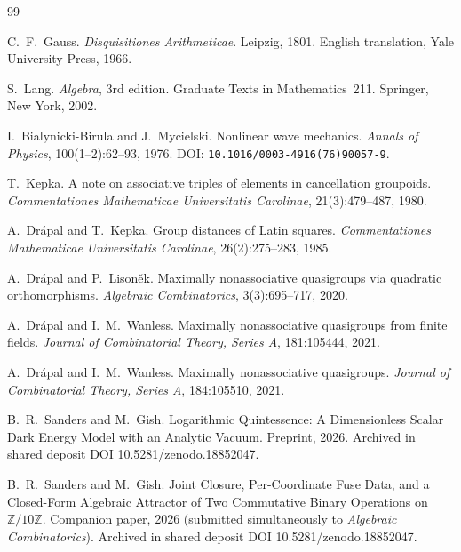 \documentclass[11pt,reqno]{amsart}
\theoremstyle{plain}
\theoremstyle{definition}
\theoremstyle{remark}
\begin{document}
\begin{thebibliography}{99}

C.~F.~Gauss.
\newblock \emph{Disquisitiones Arithmeticae}.
\newblock Leipzig, 1801.
\newblock English translation, Yale University Press, 1966.

S.~Lang.
\newblock \emph{Algebra}, 3rd edition.
\newblock Graduate Texts in Mathematics~211. Springer, New York, 2002.

I.~Bialynicki-Birula and J.~Mycielski.
\newblock Nonlinear wave mechanics.
\newblock \emph{Annals of Physics}, 100(1--2):62--93, 1976.
\newblock DOI: \texttt{10.1016/0003-4916(76)90057-9}.

T.~Kepka.
\newblock A note on associative triples of elements in cancellation groupoids.
\newblock \emph{Commentationes Mathematicae Universitatis Carolinae},
21(3):479--487, 1980.

A.~Dr\'{a}pal and T.~Kepka.
\newblock Group distances of Latin squares.
\newblock \emph{Commentationes Mathematicae Universitatis Carolinae},
26(2):275--283, 1985.

A.~Dr\'{a}pal and P.~Lison\v{e}k.
\newblock Maximally nonassociative quasigroups via quadratic orthomorphisms.
\newblock \emph{Algebraic Combinatorics}, 3(3):695--717, 2020.

A.~Dr\'{a}pal and I.~M.~Wanless.
\newblock Maximally nonassociative quasigroups from finite fields.
\newblock \emph{Journal of Combinatorial Theory, Series A}, 181:105444, 2021.

A.~Dr\'{a}pal and I.~M.~Wanless.
\newblock Maximally nonassociative quasigroups.
\newblock \emph{Journal of Combinatorial Theory, Series A}, 184:105510, 2021.

B.~R.~Sanders and M.~Gish.
\newblock Logarithmic Quintessence: A Dimensionless Scalar Dark Energy
Model with an Analytic Vacuum.
\newblock Preprint, 2026.
\newblock Archived in shared deposit DOI 10.5281/zenodo.18852047.

B.~R.~Sanders and M.~Gish.
\newblock Joint Closure, Per-Coordinate Fuse Data, and a Closed-Form
Algebraic Attractor of Two Commutative Binary Operations on
$\mathbb{Z}/10\mathbb{Z}$.
\newblock Companion paper, 2026 (submitted simultaneously to
\emph{Algebraic Combinatorics}).
\newblock Archived in shared deposit DOI 10.5281/zenodo.18852047.

\end{thebibliography}
\end{document}
